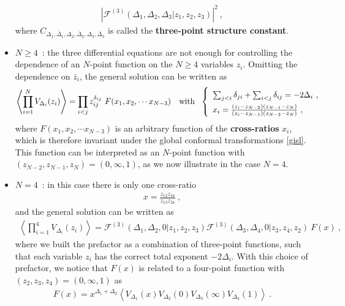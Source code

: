 \documentclass[12pt, a4paper, notitlepage, twoside]{report}
\numberwithin{equation}{section}
\theoremstyle{break}
\begin{document}
\begin{itemize}
\begin{align}
 \left|\mathcal{F}^{(3)}(\Delta_1,\Delta_2,\Delta_3|z_1,z_2,z_3)\right|^2\ ,
\label{cff}
\end{align}
where $C_{\Delta_1,\bar{\Delta}_1,\Delta_2,\bar{\Delta}_2,\Delta_3,\bar{\Delta}_3}$ is called the \textbf{\boldmath three-point structure constant}.
\item $\boxed{N\geq 4}$\ : the three differential equations are not enough for controlling the dependence of an $N$-point function on the $N\geq 4$ variables $z_i$.
Omitting the dependence on $\bar{z}_i$, the general solution can be written as 
\begin{align}
 \left\langle\prod_{i=1}^N V_{\Delta_i}(z_i)\right\rangle = \prod_{i<j} z_{ij}^{\delta_{ij}}\ F(x_1,x_2,\cdots x_{N-3}) \quad \text{with} \ \ 
\renewcommand{\arraystretch}{1.5}
\left\{\begin{array}{l}  \sum_{j< i} \delta_{ji} +\sum_{i<j}\delta_{ij} = -2\Delta_i\ ,
\\ x_i = \frac{(z_i-z_{N-2})(z_{N-1}-z_N)}{(z_i-z_{N-1})(z_{N-2}-z_N)}\ , \end{array}\right. 
\label{xfxn}
\end{align}
where $F(x_1,x_2,\cdots x_{N-3})$ is an arbitrary function of the \textbf{\boldmath cross-ratios} $x_i$, which is therefore invariant under the global conformal transformations \eqref{gisl}.
This function can be interpreted as an $N$-point function with $(z_{N-2},z_{N-1},z_N)=(0,\infty,1)$, as we now illustrate in the case $N=4$.
\item $\boxed{N=4}$\ : in this case there is only one cross-ratio 
\begin{align}
 x=\frac{z_{12}z_{34}}{z_{13}z_{24}}\ ,
\label{xe}
\end{align}
and the general solution can be written as 
\begin{align}
 \left\langle\prod_{i=1}^4 V_{\Delta_i}(z_i)\right\rangle = \mathcal{F}^{(3)}(\Delta_1,\Delta_2,0|z_1,z_2,z_3) \mathcal{F}^{(3)}(\Delta_3,\Delta_4,0|z_3,z_4,z_2)\ F(x)\ ,
\label{zgg}
\end{align}
where we built the prefactor as a combination of three-point functions, such that each variable $z_i$ has the correct total exponent $-2\Delta_i$.
With this choice of prefactor, we notice that $F(x)$ is related to a four-point function with $(z_2,z_3,z_4)=(0,\infty,1)$ as
\begin{align}
 F(x) =x^{\Delta_1+\Delta_2} \left\langle V_{\Delta_1}(x)V_{\Delta_2}(0)V_{\Delta_3}(\infty) V_{\Delta_4}(1)\right\rangle \ .
\label{fx}
\end{align}
\end{itemize}
\end{document}
